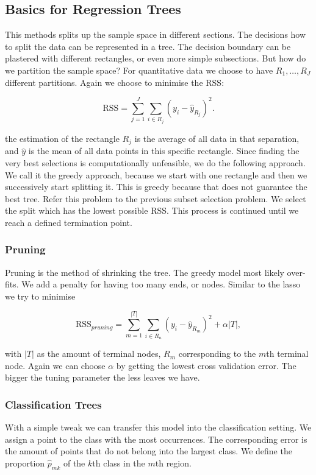 \documentclass{article}
\begin{document}
\subsection{Basics for Regression Trees}
This methods splits up the sample space in different sections. The decisions how to split the data can be represented in a tree. The decision boundary can be plastered with different rectangles, or even more simple subsections. But how do we partition the sample space? For quantitative data we choose to have $R_1,\dots,R_J$ different partitions. Again we choose to minimise the RSS:

$$ \text{RSS}=\sum_{j=1}^J \sum_{i \in R_j} (y_i-\hat{y}_{R_j})^2. $$

the estimation of the rectangle $R_j$ is the average of all data in that separation, and 
$\hat{y}$ is the mean of all data points in this specific rectangle. Since finding the very best selections is computationally unfeasible, we do the following approach. We call it the greedy approach, because we start with one rectangle and then we successively start splitting it. This is greedy because that does not guarantee the best tree. Refer this problem to the previous subset selection problem. We select the split which has the lowest possible RSS. This process is continued until we reach a defined termination point.

\subsubsection{Pruning}

Pruning is the method of shrinking the tree. The greedy model most likely over-fits. We add a penalty for having too many ends, or nodes. Similar to the lasso we try to minimise

\begin{equation}
    \text{RSS}_{pruning}=\sum_{m=1}^{|T|} \sum_{i \in R_n} (y_i-\hat{y}_{R_m})^2 + \alpha |T|,
\end{equation}

with $|T|$ as the amount of terminal nodes, $R_m$ corresponding to the $m$th terminal node. Again we can choose $\alpha$ by getting the lowest cross validation error. The bigger the tuning parameter the less leaves we have.  

\subsubsection{Classification Trees}

With a simple tweak we can transfer this model into the classification setting. We assign a point to the class with the most occurrences. The corresponding error is the amount of points that do not belong into the largest class. We define the proportion $\hat{p}_{mk}$  of the $k$th class in the $m$th region. 
\end{document}
